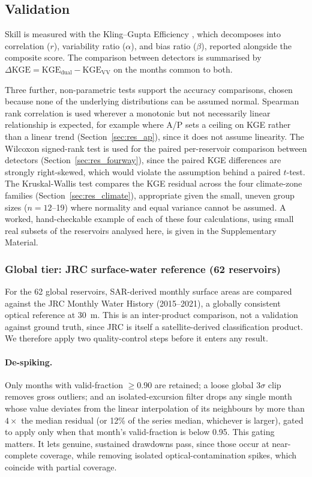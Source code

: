 \subsection{Validation}
\label{sec:methods_validation}

Skill is measured with the Kling--Gupta Efficiency
\citep[KGE;][]{Gupta2009}, which decomposes into correlation ($r$),
variability ratio ($\alpha$), and bias ratio ($\beta$), reported alongside the
composite score. The comparison between detectors is summarised by
$\Delta\text{KGE} = \text{KGE}_{\text{dual}} - \text{KGE}_{\text{VV}}$ on the
months common to both.

Three further, non-parametric tests support the accuracy comparisons, chosen
because none of the underlying distributions can be assumed normal. Spearman
rank correlation \citep{Spearman1904} is used wherever a monotonic but not
necessarily linear relationship is expected, for example where A/P sets a
ceiling on KGE rather than a linear trend (Section~\ref{sec:res_ap}), since it
does not assume linearity. The Wilcoxon signed-rank test \citep{Wilcoxon1945}
is used for the paired per-reservoir comparison between detectors
(Section~\ref{sec:res_fourway}), since the paired KGE differences are
strongly right-skewed, which would violate the assumption behind a paired
$t$-test. The Kruskal-Wallis test \citep{KruskalWallis1952} compares the KGE
residual across the four climate-zone families (Section~\ref{sec:res_climate}),
appropriate given the small, uneven group sizes ($n=12$--19) where normality
and equal variance cannot be assumed. A worked, hand-checkable example of
each of these four calculations, using small real subsets of the reservoirs
analysed here, is given in the Supplementary Material.

\subsubsection{Global tier: JRC surface-water reference (62 reservoirs)}
\label{sec:val_global}

For the 62 global reservoirs, SAR-derived monthly surface areas are compared
against the JRC Monthly Water History \citep{Pekel2016} (2015--2021), a
globally consistent optical reference at 30~m. This is an inter-product
comparison, not a validation against ground truth, since JRC is itself a
satellite-derived classification product. We therefore apply two
quality-control steps before it enters any result.

\paragraph{De-spiking.} Only months with valid-fraction $\geq$0.90 are
retained; a loose global $3\sigma$ clip removes gross outliers; and an
isolated-excursion filter drops any single month whose value deviates from the
linear interpolation of its neighbours by more than $4\times$ the median
residual (or 12\% of the series median, whichever is larger), gated to apply
only when that month's valid-fraction is below 0.95. This gating matters. It
lets genuine, sustained drawdowns pass, since those occur at near-complete
coverage, while removing isolated optical-contamination spikes, which
coincide with partial coverage.

